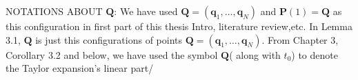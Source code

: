 NOTATIONS ABOUT $\mathbf{Q}$:
We have used  $\mathbf{Q} =(\mathbf{q}_1,\dots,\mathbf{q}_N)$ and $\mathbf{P}(1)=\mathbf{Q}$ as this configuration in first part of this thesis Intro, literature review,etc. In Lemma 3.1,  $\mathbf{Q}$ is just this configurations of points $\mathbf{Q} =(\mathbf{q}_1,\dots,\mathbf{q}_N)$. From Chapter 3, Corollary 3.2 and below, we have used the symbol  $\mathbf{Q}$( along with $t_0$) to denote the Taylor expansion's linear part/







































